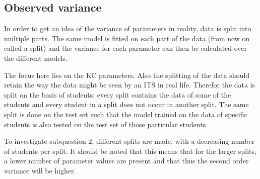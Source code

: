 \documentclass{scrartcl}
\begin{document}
\subsection{Observed variance}

In order to get an idea of the variance of parameters in reality, data is split into multiple parts. The same model is fitted on each part of the data (from now on called a split) and the variance for each parameter can then be calculated over the different models. 

The focus here lies on the KC parameters. Also the splitting of the data should retain the way the data might be seen by an ITS in real life. Therefor the data is split on the basis of students: every split contains the data of some of the students and every student in a split does not occur in another split. The same split is done on the test set such that the model trained on the data of specific students is also tested on the test set of those particular students.

To investigate subquestion 2, different splits are made, with a decreasing number of students per split. It should be noted that this means that for the larger splits, a lower number of parameter values are present and that thus the second order variance will be higher.
\end{document}
